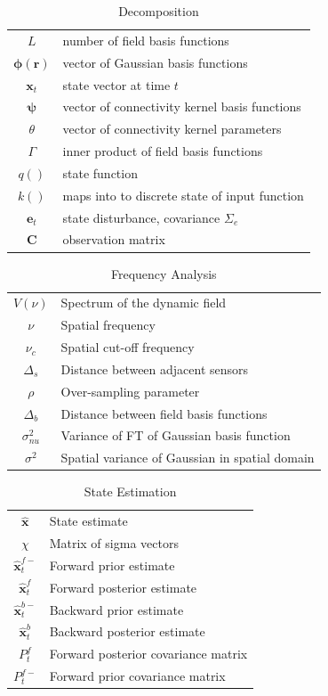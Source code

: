 \documentclass[10pt,a4paper]{article}
\begin{document}
\begin{table}[h!]\footnotesize
    \centering
    \begin{tabular}{cl}
        $L$ & number of field basis functions  \\
    	$\mathbf{\phi(r)}$ & vector of Gaussian basis functions \\
    	$\mathbf{x}_t$ & state vector at time $t$ \\
    	$\mathbf{\psi}$ & vector of connectivity kernel basis functions \\
    	$\theta$ & vector of connectivity kernel parameters \\
    	$\Gamma$ & inner product of field basis functions \\
    	$q()$ & state function \\
    	$k()$ & maps into to discrete state of input function \\
    	$\mathbf{e}_t$ & state disturbance, covariance $\Sigma_e$ \\
    	$\mathbf{C}$ & observation matrix \\
    \end{tabular}
    \caption{Decomposition}
\end{table}

\begin{table}[h!]\footnotesize
    \centering
    \begin{tabular}{cl}
        $V(\nu)$ & Spectrum of the dynamic field \\
	$\nu$ & Spatial frequency \\
	$\nu_c$ & Spatial cut-off frequency \\
	$\Delta_s$ & Distance between adjacent sensors \\
	$\rho$ & Over-sampling parameter \\
	$\Delta_b$ & Distance between field basis functions \\
	$\sigma_{nu}^2$ & Variance of FT of Gaussian basis function \\
	$\sigma^2$ & Spatial variance of Gaussian in spatial domain \\
    \end{tabular}
    \caption{Frequency Analysis}
\end{table}

\begin{table}[h!]\footnotesize
    \centering
    \begin{tabular}{cl}
        $\hat{\mathbf{x}}$ & State estimate \\
	    $\chi$ & Matrix of sigma vectors \\
    	$\hat{\mathbf{x}}_t^{f-}$ & Forward prior estimate \\
    	$\hat{\mathbf{x}}_t^f$ & Forward posterior estimate \\
    	$\hat{\mathbf{x}}_t^{b-}$ & Backward prior estimate \\
    	$\hat{\mathbf{x}}_t^{b}$ & Backward posterior estimate \\
    	$P^f_t$ & Forward posterior covariance matrix \\
    	$P^{f-}_t$ & Forward prior covariance matrix
    \end{tabular}
    \caption{State Estimation}
\end{table}
\end{document}
